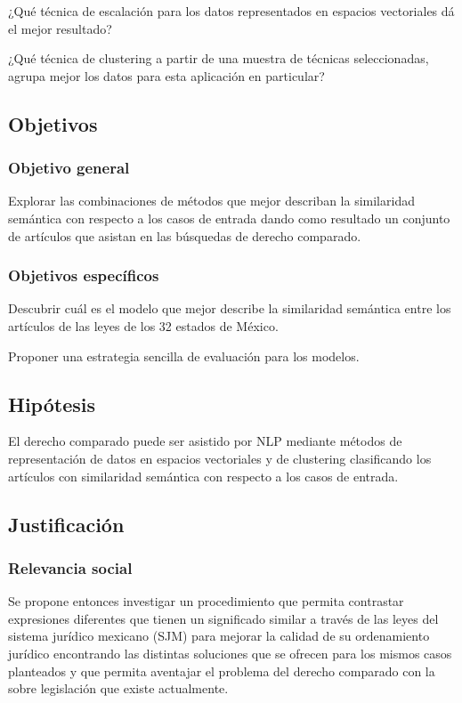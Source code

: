 \documentclass[12pt]{article}
\begin{document}
		¿Qué técnica de escalación para los datos representados en espacios vectoriales dá el mejor resultado?
		
		
		¿Qué técnica de clustering a partir de una muestra de técnicas seleccionadas, agrupa mejor los datos para esta aplicación en particular?
		
		\subsection{Objetivos}
			\subsubsection{Objetivo general}
			Explorar las combinaciones de métodos que mejor describan la similaridad semántica con respecto a los casos de entrada dando como resultado un conjunto de artículos que asistan en las búsquedas de derecho comparado.
			
			
			\subsubsection{Objetivos específicos}
			Descubrir cuál es el modelo que mejor describe la similaridad semántica entre los artículos de las leyes de los 32 estados de México.
			
			Proponer una estrategia sencilla de evaluación para los modelos. 
			
		
		\subsection{Hipótesis}
		El derecho comparado puede ser asistido por NLP mediante métodos de representación de datos en espacios vectoriales y de clustering clasificando los artículos con similaridad semántica con respecto a los casos de entrada.
		
		
		
		\subsection{Justificación}
			\subsubsection{Relevancia social}
			Se propone entonces investigar un procedimiento que permita contrastar expresiones diferentes que tienen un significado similar a través de las leyes del sistema jurídico mexicano (SJM) para mejorar la calidad de su ordenamiento jurídico encontrando las distintas soluciones que se ofrecen para los mismos casos planteados y que permita aventajar el problema del derecho comparado con la sobre legislación que existe actualmente.
	
\end{document}
